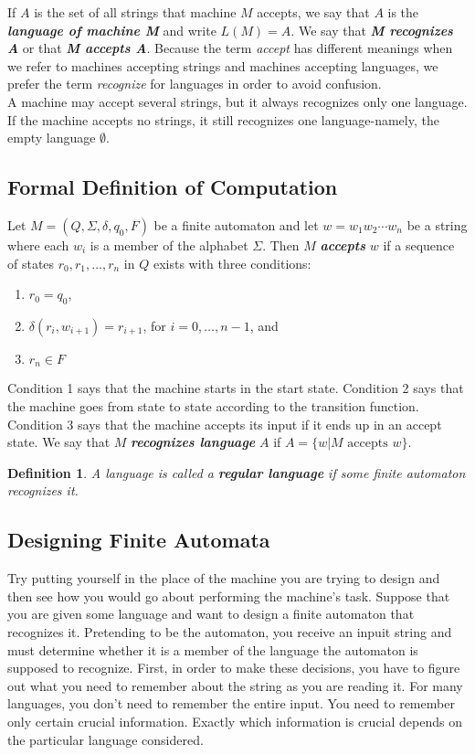 \documentclass{article}
\newtheorem{definition}{Definition}
\newcommand{\define}[1]{\textbf{\textit{#1}}}
\begin{document}
If $A$ is the set of all strings that machine $M$ accepts, we say that $A$ is the \define{language of machine M} and write $L(M) = A$. We say that \define{M recognizes A} or that \define{M accepts A}. Because the term \emph{accept} has different meanings when we refer to machines accepting strings and machines accepting languages, we prefer the term \emph{recognize} for languages in order to avoid confusion. \\ 

A machine may accept several strings, but it always recognizes only one language. If the machine accepts no strings, it still recognizes one language-namely, the empty language  $\emptyset$. 

\subsection{Formal Definition of Computation}

Let $M = (Q, \Sigma, \delta, q_{0}, F)$ be a finite automaton and let $w=w_{1}w_{2} \cdots w_{n}$ be a string where each $w_{i}$ is a member of the alphabet $\Sigma$. Then $M$ \define{accepts} $w$ if a sequence of states $r_{0}, r_{1}, \dots, r_{n}$ in $Q$ exists with three conditions:

\begin{enumerate}
  \item $r_0 = q_0$,
  \item $\delta(r_{i},w_{i+1}) = r_{i+1}$, for $i=0, \dots, n-1$, and 
  \item $r_{n} \in F$
\end{enumerate}

Condition 1 says that the machine starts in the start state. Condition 2 says that the machine goes from state to state according to the transition function. Condition 3 says that the machine accepts its input if it ends up in an accept state. We say that $M$ \define{recognizes language} $A$ if $A = \{w \vert M \textrm{ accepts } w \}$. 

\begin{definition}
  A language is called a \define{regular language} if some finite automaton recognizes it. 
\end{definition}

\subsection{Designing Finite Automata}

Try putting yourself in the place of the machine you are trying to design and then see how you would go about performing the machine's task. Suppose that you are given some language and want to design a finite automaton that recognizes it. Pretending to be the automaton, you receive an inpuit string and must determine whether it is a member of the language the automaton is supposed to recognize. First, in order to make these decisions, you have to figure out what you need to remember about the string as you are reading it. For many languages, you don't need to remember the entire input. You need to remember only certain crucial information. Exactly which information is crucial depends on the particular language considered. \\ 
\end{document}
